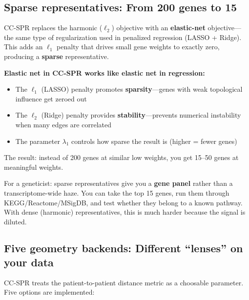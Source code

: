 \documentclass[11pt]{article}
\begin{document}
\subsection{Sparse representatives: From 200 genes to 15}

CC-SPR replaces the harmonic ($\ell_2$) objective with an \textbf{elastic-net} objective---the same type of regularization used in penalized regression (LASSO + Ridge). This adds an $\ell_1$ penalty that drives small gene weights to exactly zero, producing a \textbf{sparse} representative.

\begin{keyconcept}
\textbf{Elastic net in CC-SPR works like elastic net in regression:}
\begin{itemize}[leftmargin=1.5em]
    \item The $\ell_1$ (LASSO) penalty promotes \textbf{sparsity}---genes with weak topological influence get zeroed out
    \item The $\ell_2$ (Ridge) penalty provides \textbf{stability}---prevents numerical instability when many edges are correlated
    \item The parameter $\lambda_1$ controls how sparse the result is (higher = fewer genes)
\end{itemize}
The result: instead of 200 genes at similar low weights, you get 15--50 genes at meaningful weights.
\end{keyconcept}

\begin{takeaway}
For a geneticist: sparse representatives give you a \textbf{gene panel} rather than a transcriptome-wide haze. You can take the top 15 genes, run them through KEGG/Reactome/MSigDB, and test whether they belong to a known pathway. With dense (harmonic) representatives, this is much harder because the signal is diluted.
\end{takeaway}

\subsection{Five geometry backends: Different ``lenses'' on your data}

CC-SPR treats the patient-to-patient distance metric as a choosable parameter. Five options are implemented:
\end{document}
